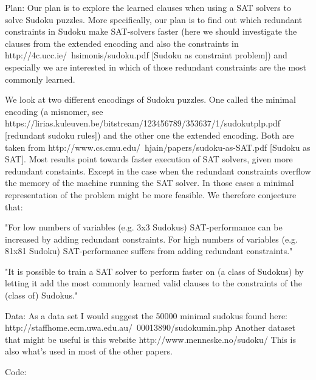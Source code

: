 \documentclass{article}
\begin{document}
Plan:
Our plan is to explore the learned clauses when using a SAT solvers to solve Sudoku puzzles. More specifically, our plan is to find out which redundant constraints in Sudoku make SAT-solvers faster (here we should investigate the clauses from the extended encoding and also the constraints in http://4c.ucc.ie/~hsimonis/sudoku.pdf [Sudoku as constraint problem]) and especially we are interested in which of those redundant constraints are the most commonly learned.

We look at two different encodings of Sudoku puzzles. One called the minimal encoding (a misnomer, see https://lirias.kuleuven.be/bitstream/123456789/353637/1/sudokutplp.pdf [redundant sudoku rules]) and the other one the extended encoding. Both are taken from http://www.cs.cmu.edu/~hjain/papers/sudoku-as-SAT.pdf [Sudoku as SAT]. Most results point towards faster execution of SAT solvers, given more redundant constaints. Except in the case when the redundant constraints overflow the memory of the machine running the SAT solver. In those cases a minimal representation of the problem might be more feasible. We therefore conjecture that:

	"For low numbers of variables (e.g. 3x3 Sudokus) SAT-performance can be increased by adding redundant constraints.
	For high numbers of variables (e.g. 81x81 Sudoku) SAT-performance suffers from adding redundant constraints."

  "It is possible to train a SAT solver to perform faster on (a class of Sudokus) by letting it add the most commonly learned valid clauses to the constraints of the (class of) Sudokus."

Data:
As a data set I would suggest the 50000 minimal sudokus found here: http://staffhome.ecm.uwa.edu.au/~00013890/sudokumin.php
Another dataset that might be useful is this website http://www.menneske.no/sudoku/
This is also what's used in most of the other papers.

Code:






\end{document}
